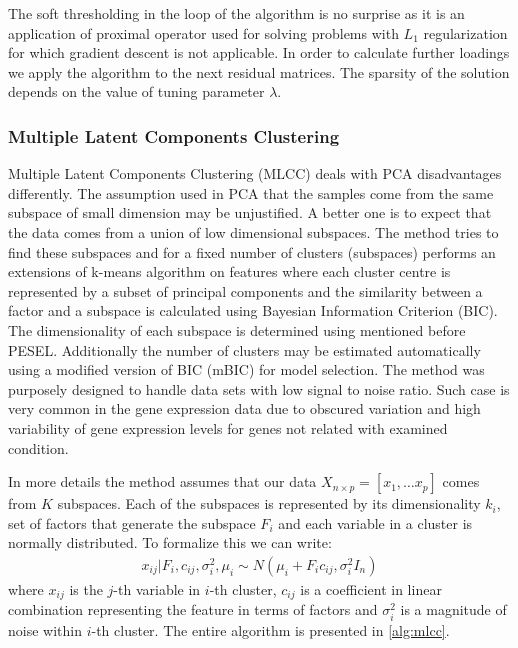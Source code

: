 \documentclass[shortabstract, english, mgr]{iithesis}
\begin{document}
The soft thresholding in the loop of the algorithm is no surprise as it is an application of proximal operator used for solving problems with $L_1$ regularization for which gradient descent is not applicable. In order to calculate further loadings we apply the algorithm to the next residual matrices. The sparsity of the solution depends on the value of tuning parameter $\lambda$.

\subsubsection{Multiple Latent Components Clustering}

Multiple Latent Components Clustering (MLCC) deals with PCA disadvantages differently. The assumption used in PCA that the samples come from the same subspace of small dimension may be unjustified. A better one is to expect that the data comes from a union of low dimensional subspaces. The method tries to find these subspaces and for a fixed number of clusters (subspaces) performs an extensions of k-means algorithm on features where each cluster centre is represented by a subset of principal components and the similarity between a factor and a subspace is calculated using Bayesian Information Criterion (BIC). The dimensionality of each subspace is determined using mentioned before PESEL. Additionally the number of clusters may be estimated automatically using a modified version of BIC (mBIC) for model selection. The method was purposely designed to handle data sets with low signal to noise ratio. Such case is very common in the gene expression data due to obscured variation and high variability of gene expression levels for genes not related with examined condition.

In more details the method assumes that our data $X_{n\times p} = [x_1, \ldots x_p]$ comes from $K$ subspaces. Each of the subspaces is represented by its dimensionality $k_i$, set of factors that generate the subspace $F_i$ and each variable in a cluster is normally distributed. To formalize this we can write:
\begin{align*}
    x_{i j} | F_{i}, c_{i j}, \sigma_{i}^{2}, \mu_{i} \sim N\left(\mu_{i} + F_{i} c_{i j}, \sigma_{i}^{2} I_{n}\right)
\end{align*} 
where $x_{ij}$ is the $j$-th variable in $i$-th cluster, $c_{ij}$ is a coefficient in linear combination representing the feature in terms of factors and $\sigma_i^2$ is a magnitude of noise within $i$-th cluster. The entire algorithm is presented in \ref{alg:mlcc}.
\end{document}
